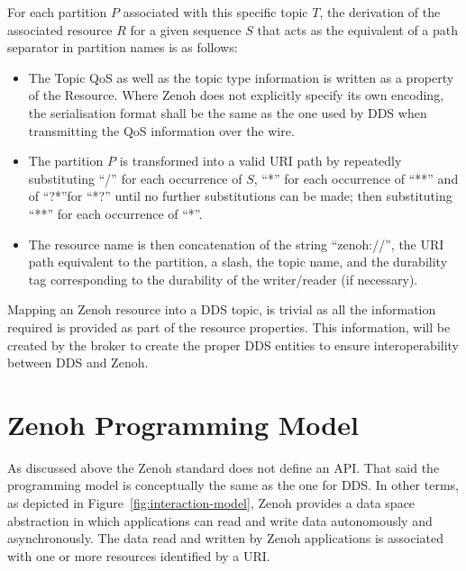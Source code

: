 \documentclass[a4paper,oneside,article]{memoir}
\begin{document}
For each partition $P$ associated with this specific topic $T$, the derivation of the associated
resource $R$ for a given sequence $S$ that acts as the equivalent of a path separator in partition
names is as follows:
\begin{itemize}
\item The Topic QoS as well as the topic type information is written as a property of the Resource.
  Where Zenoh does not explicitly specify its own encoding, the serialisation format shall be the
  same as the one used by DDS when transmitting the QoS information over the wire.
\item The partition $P$ is transformed into a valid URI path by repeatedly substituting ``/'' for
  each occurrence of $S$, ``*'' for each occurrence of ``**'' and of ``?*''for ``*?'' until no
  further substitutions can be made; then substituting ``**'' for each occurrence of ``*''.
\item The resource name is then concatenation of the string ``zenoh://'', the URI path equivalent to
  the partition, a slash, the topic name, and the durability tag corresponding to the durability of
  the writer/reader (if necessary).
\end{itemize}
Mapping an Zenoh resource into a DDS topic, is trivial as all the information required is provided as
part of the resource properties.  This information, will be created by the broker to create the
proper DDS entities to ensure interoperability between DDS and Zenoh.

\section{Zenoh Programming Model}

As discussed above the Zenoh standard does not define an API\@.  That said the programming model is
conceptually the same as the one for DDS\@.  In other terms, as depicted in
Figure~\ref{fig:interaction-model}, Zenoh provides a data space abstraction in which applications can
read and write data autonomously and asynchronously.  The data read and written by Zenoh applications
is associated with one or more resources identified by a URI\@.
\end{document}
